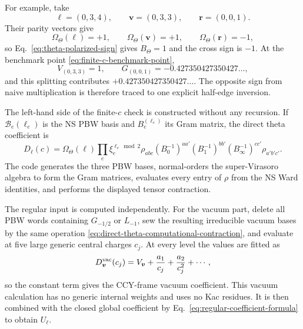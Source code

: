 \documentclass[11pt]{article}
\begin{document}
For example, take
\begin{equation}
 \bm\ell=(0,3,4),\qquad
 \bm v=(0,3,3),\qquad
 \bm r=(0,0,1).
 \label{eq:graded-convolution-example-levels}
\end{equation}
Their parity vectors give
\begin{equation}
 \Omega_\Theta(\bm\ell)=+1,\qquad
 \Omega_\Theta(\bm v)=+1,\qquad
 \Omega_\Theta(\bm r)=-1,
 \label{eq:graded-convolution-example-signs}
\end{equation}
so Eq.~\eqref{eq:theta-polarized-sign} gives \(B_\Theta=1\) and the cross
sign is \(-1\).  At the benchmark point
\eqref{eq:finite-c-benchmark-point},
\begin{equation}
 V_{(0,3,3)}=1,\qquad
 G_{(0,0,1)}=-0.427350427350427\ldots,
\end{equation}
and this splitting contributes
\(+0.427350427350427\ldots\).  The opposite sign from naive multiplication
is therefore traced to one explicit half-edge inversion.

The left-hand side of the finite-\(c\) check is constructed without any
recursion.  If \(\mathcal B_e(\ell_e)\) is the NS PBW basis and
\(B_e^{(\ell_e)}\) its Gram matrix, the direct theta coefficient is
\begin{equation}
 D_{\bm\ell}(c)
 =\Omega_\Theta(\bm\ell)
  \prod_e\xi_e^{\ell_e\bmod2}
  \rho_{abc}
  (B_0^{-1})^{aa'}(B_1^{-1})^{bb'}
  (B_\infty^{-1})^{cc'}
  \rho_{a'b'c'}.
 \label{eq:direct-theta-computational-contraction}
\end{equation}
The code generates the three PBW bases, normal-orders the super-Virasoro
algebra to form the Gram matrices, evaluates every entry of \(\rho\) from the
NS Ward identities, and performs the displayed tensor contraction.

The regular input is computed independently.  For the vacuum part, delete
all PBW words containing \(G_{-1/2}\) or \(L_{-1}\), sew the resulting
irreducible vacuum bases by the same operation
\eqref{eq:direct-theta-computational-contraction}, and evaluate at five large
generic central charges \(c_j\).  At every level the values are fitted as
\begin{equation}
 D^{\rm vac}_{\bm v}(c_j)
 =V_{\bm v}+\frac{a_1}{c_j}+\frac{a_2}{c_j^2}+\cdots,
 \label{eq:vacuum-richardson-extraction}
\end{equation}
so the constant term gives the CCY-frame vacuum coefficient.  This vacuum
calculation has no generic internal weights and uses no Kac residues.  It is
then combined with the closed global coefficient by
Eq.~\eqref{eq:regular-coefficient-formula} to obtain \(U_{\bm\ell}\).
\end{document}
